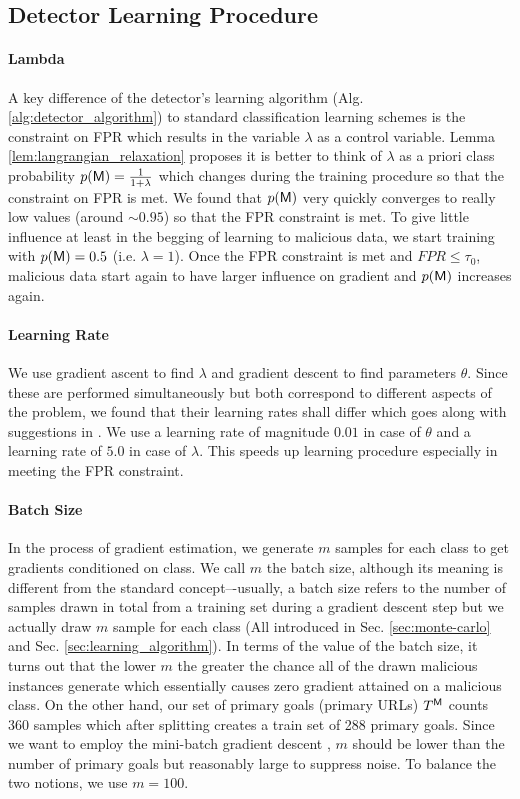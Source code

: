 \subsection{Detector Learning Procedure}

\paragraph{Lambda}
A key difference of the detector's learning algorithm (Alg. \ref{alg:detector_algorithm}) to standard classification learning schemes is the constraint on FPR which results in the variable $\lambda$ as a control variable. Lemma \ref{lem:langrangian_relaxation} proposes it is better to think of $\lambda$ as a priori class probability $p(\mathsf{M}) = \frac{1}{1 + \lambda}$ which changes during the training procedure so that the constraint on FPR is met. We found that $p(\mathsf{M})$ very quickly converges to really low values (around $\sim0.95$) so that the FPR constraint is met.
To give little influence at least in the begging of learning to malicious data, we start training with $p(\mathsf{M}) = 0.5$ (i.e. $\lambda = 1$). Once the FPR constraint is met and $FPR \leq \tau_0$, malicious data start again to have larger influence on gradient and $p(\mathsf{M})$ increases again.

\paragraph{Learning Rate}
We use gradient ascent to find $\lambda$ and gradient descent to find  parameters $\theta$. Since these are performed simultaneously but both correspond to different aspects of the problem, we found that their learning rates shall differ which goes along with suggestions in \cite{learning_rate}. We use a learning rate of magnitude $0.01$ in case of $\theta$ and a learning rate of $5.0$ in case of $\lambda$. This speeds up learning procedure especially in meeting the FPR constraint.

\paragraph{Batch Size}
In the process of gradient estimation, we generate $m$ samples for each class to get gradients conditioned on class. We call $m$ the batch size, although its meaning is different from the standard concept–-usually, a batch size refers to the number of samples drawn in total from a training set during a gradient descent step but we actually draw $m$ sample for each class (All introduced in Sec. \ref{sec:monte-carlo} and Sec. \ref{sec:learning_algorithm}). In terms of the value of the batch size, it turns out that the lower $m$ the greater the chance all of the drawn malicious instances generate \NA which essentially causes zero gradient attained on a malicious class. On the other hand, our set of primary goals (primary URLs) $T^{\mathsf{M}}$ counts $360$ samples which after splitting creates a train set of 288 primary goals. Since we want to employ the mini-batch gradient descent \cite{minibatch_descent}, $m$ should be lower than the number of primary goals but reasonably large to suppress noise. To balance the two notions, we use $m=100$.

